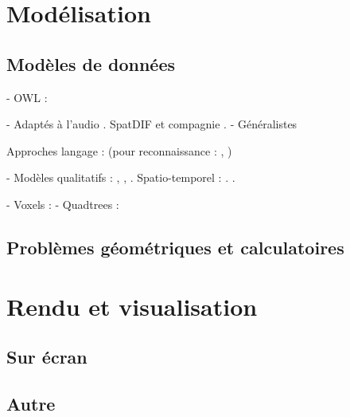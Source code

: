 \documentclass[french,12pt]{article}
\begin{document}
\section{Modélisation}
\cite{porter_handbook_2008}
\cite{grenon_formal_2003}
\cite{zhang_timed_2014}
\cite{benford_spatial_1993}

\cite{matlage_every_2011}
\subsection{Modèles de données}
- OWL : \cite{mefteh_approche_2013}

- Adaptés à l'audio
. SpatDIF et compagnie \cite{peters_spatial_2013}\cite{kendall_towards_2008}
. \cite{kondoz_object-based_2014}
- Généralistes
\cite{hudak_arrows_2003}

Approches langage : (pour reconnaissance : \cite{spranger_recruitment_2011}\cite{spranger_emergent_2012}, )

- Modèles qualitatifs : \cite{chen_survey_2015}, \cite{bhatt_geospatial_2014}, \cite{schlieder_qualitative_1996,dorr_qualitative_2014}. Spatio-temporel : \cite{hazarika_qualitative_2012}. \cite{clementini_global_1997}.

- Voxels : \cite{kaufman_volume_1993}
- Quadtrees : \cite{eppstein_skip_2008}
\subsection{Problèmes géométriques et calculatoires}

\section{Rendu et visualisation}
\cite{hortner_spaxels_2012}
\subsection{Sur écran}
\subsection{Autre}
\printbibliography
\end{document}
